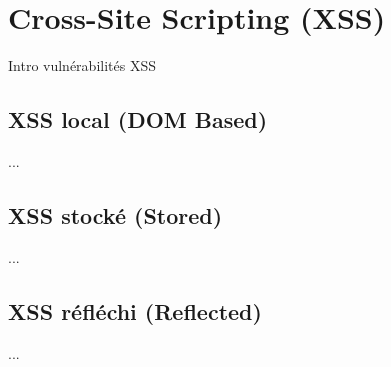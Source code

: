 

\newpage
\section{Cross-Site Scripting (XSS)}\label{vulnerabilites:web:xss}

Intro vulnérabilités XSS

\subsection{XSS local (DOM Based)}\label{vulnerabilites:web:xss:dom}

...

\subsection{XSS stocké (Stored)}\label{vulnerabilites:web:xss:stored}

...

\subsection{XSS réfléchi (Reflected)}\label{vulnerabilites:web:xss:reflected}

...

\endinput
